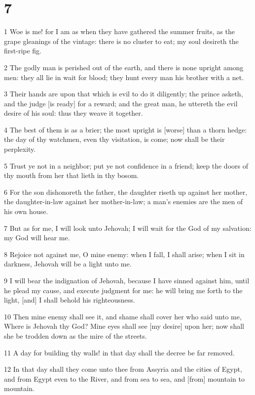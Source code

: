 \chapter{7}

\par 1 Woe is me! for I am as when they have gathered the summer fruits, as the grape gleanings of the vintage: there is no cluster to eat; my soul desireth the first-ripe fig.
\par 2 The godly man is perished out of the earth, and there is none upright among men: they all lie in wait for blood; they hunt every man his brother with a net.
\par 3 Their hands are upon that which is evil to do it diligently; the prince asketh, and the judge [is ready] for a reward; and the great man, he uttereth the evil desire of his soul: thus they weave it together.
\par 4 The best of them is as a brier; the most upright is [worse] than a thorn hedge: the day of thy watchmen, even thy visitation, is come; now shall be their perplexity.
\par 5 Trust ye not in a neighbor; put ye not confidence in a friend; keep the doors of thy mouth from her that lieth in thy bosom.
\par 6 For the son dishonoreth the father, the daughter riseth up against her mother, the daughter-in-law against her mother-in-law; a man's enemies are the men of his own house.
\par 7 But as for me, I will look unto Jehovah; I will wait for the God of my salvation: my God will hear me.
\par 8 Rejoice not against me, O mine enemy: when I fall, I shall arise; when I sit in darkness, Jehovah will be a light unto me.
\par 9 I will bear the indignation of Jehovah, because I have sinned against him, until he plead my cause, and execute judgment for me: he will bring me forth to the light, [and] I shall behold his righteousness.
\par 10 Then mine enemy shall see it, and shame shall cover her who said unto me, Where is Jehovah thy God? Mine eyes shall see [my desire] upon her; now shall she be trodden down as the mire of the streets.
\par 11 A day for building thy walls! in that day shall the decree be far removed.
\par 12 In that day shall they come unto thee from Assyria and the cities of Egypt, and from Egypt even to the River, and from sea to sea, and [from] mountain to mountain.

